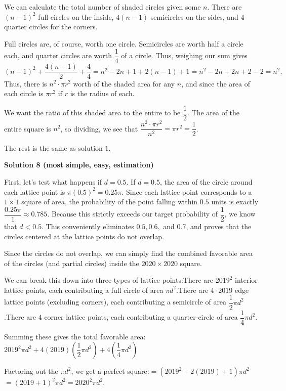 \begin{enumerate}
 We can calculate the total number of shaded circles given some $n$. There are $(n-1)^2$ full circles on the inside, $4(n-1)$ semicircles on the sides, and $4$ quarter circles for the corners. 

 Full circles are, of course, worth one circle. Semicircles are worth half a circle each, and quarter circles are worth $\dfrac14$ of a circle. Thus, weighing our sum gives $(n-1)^2+\dfrac{4(n-1)}2+\dfrac44=n^2-2n+1+2(n-1)+1=n^2-2n+2n+2-2=n^2.$ Thus, there is $n^2\cdot\pi r^2$ worth of the shaded area for any $n$, and since the area of each circle is $\pi r^2$ if $r$ is the radius of each. 

 We want the ratio of this shaded area to the entire to be $\dfrac12$. The area of the entire square is $n^2$, so dividing, we see that $\dfrac{n^2\cdot\pi r^2}{n^2}=\pi r^2=\dfrac12$. 

 The rest is the same as solution $1$.

 


 



\textbf{Solution 8 (most simple, easy, estimation)}

First, let's test what happens if $d=0.5$. If $d=0.5$, the area of the circle around each lattice point is $\pi(0.5)^2 = 0.25\pi$. Since each lattice point corresponds to a $1 \times 1$ square of area, the probability of the point falling within $0.5$ units is exactly $\dfrac{0.25\pi}{1} \approx 0.785$. Because this strictly exceeds our target probability of $\dfrac{1}{2}$, we know that $d < 0.5$. This conveniently eliminates $0.5, 0.6,$ and $0.7$, and proves that the circles centered at the lattice points do not overlap.

 Since the circles do not overlap, we can simply find the combined favorable area of the circles (and partial circles) inside the $2020 \times 2020$ square. 

 We can break this down into three types of lattice points:There are $2019^2$ interior lattice points, each contributing a full circle of area $\pi d^2$.There are $4 \cdot 2019$ edge lattice points (excluding corners), each contributing a semicircle of area $\dfrac{1}{2}\pi d^2$.There are $4$ corner lattice points, each contributing a quarter-circle of area $\dfrac{1}{4}\pi d^2$.

 Summing these gives the total favorable area:$2019^2\pi d^2 + 4(2019)\left(\dfrac{1}{2}\pi d^2\right) + 4\left(\dfrac{1}{4}\pi d^2\right)$

 Factoring out the $\pi d^2$, we get a perfect square:$= (2019^2 + 2(2019) + 1)\pi d^2$$= (2019 + 1)^2\pi d^2$$= 2020^2\pi d^2$.


\end{enumerate}
